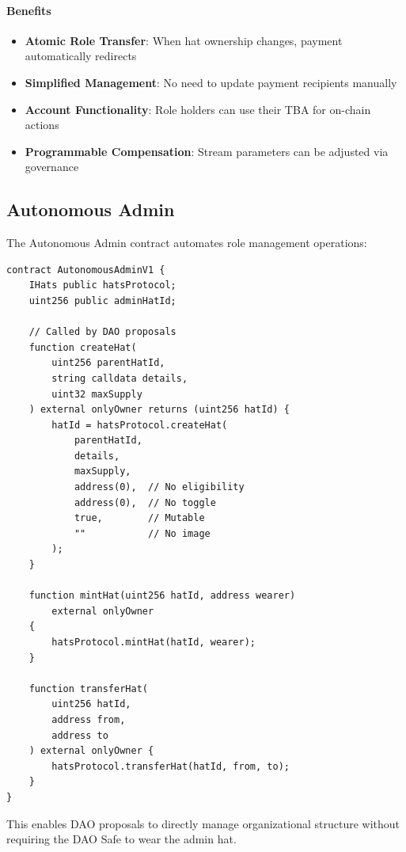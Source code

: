\paragraph{Benefits}

\begin{itemize}
    \item \textbf{Atomic Role Transfer}: When hat ownership changes, payment automatically redirects
    \item \textbf{Simplified Management}: No need to update payment recipients manually
    \item \textbf{Account Functionality}: Role holders can use their TBA for on-chain actions
    \item \textbf{Programmable Compensation}: Stream parameters can be adjusted via governance
\end{itemize}

\subsection{Autonomous Admin}

The Autonomous Admin contract automates role management operations:

\begin{lstlisting}[caption=Autonomous Admin Structure]
contract AutonomousAdminV1 {
    IHats public hatsProtocol;
    uint256 public adminHatId;

    // Called by DAO proposals
    function createHat(
        uint256 parentHatId,
        string calldata details,
        uint32 maxSupply
    ) external onlyOwner returns (uint256 hatId) {
        hatId = hatsProtocol.createHat(
            parentHatId,
            details,
            maxSupply,
            address(0),  // No eligibility
            address(0),  // No toggle
            true,        // Mutable
            ""           // No image
        );
    }

    function mintHat(uint256 hatId, address wearer)
        external onlyOwner
    {
        hatsProtocol.mintHat(hatId, wearer);
    }

    function transferHat(
        uint256 hatId,
        address from,
        address to
    ) external onlyOwner {
        hatsProtocol.transferHat(hatId, from, to);
    }
}
\end{lstlisting}

This enables DAO proposals to directly manage organizational structure without requiring the DAO Safe to wear the admin hat.

